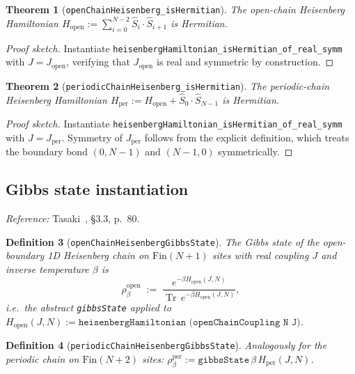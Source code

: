 \documentclass[a4paper,11pt]{article}
\newtheorem{theorem}{Theorem}
\newtheorem{definition}[theorem]{Definition}
\begin{document}
\begin{theorem}[\texttt{openChainHeisenberg\_isHermitian}]
The open-chain Heisenberg Hamiltonian
$H_{\mathrm{open}} := \sum_{i=0}^{N-2} \hat S_i \cdot \hat S_{i+1}$
is Hermitian.
\end{theorem}

\begin{proof}[Proof sketch]
Instantiate \texttt{heisenbergHamiltonian\_isHermitian\_of\_real\_symm}
with $J = J_{\mathrm{open}}$, verifying that $J_{\mathrm{open}}$ is
real and symmetric by construction.
\end{proof}

\begin{theorem}[\texttt{periodicChainHeisenberg\_isHermitian}]
The periodic-chain Heisenberg Hamiltonian
$H_{\mathrm{per}} := H_{\mathrm{open}} + \hat S_0 \cdot \hat S_{N-1}$
is Hermitian.
\end{theorem}

\begin{proof}[Proof sketch]
Instantiate \texttt{heisenbergHamiltonian\_isHermitian\_of\_real\_symm}
with $J = J_{\mathrm{per}}$.  Symmetry of $J_{\mathrm{per}}$ follows
from the explicit definition, which treats the boundary bond
$(0, N-1)$ and $(N-1, 0)$ symmetrically.
\end{proof}

\subsection{Gibbs state instantiation}
\label{subsec:heisenberg-gibbs}

\emph{Reference:} Tasaki~\cite{Tasaki:QMB}, §3.3, p.~80.

\begin{definition}[\texttt{openChainHeisenbergGibbsState}]
The Gibbs state of the open-boundary 1D Heisenberg chain on
$\mathrm{Fin}(N+1)$ sites with real coupling $J$ and inverse temperature
$\beta$ is
\[
  \rho_\beta^{\mathrm{open}} \;:=\;
  \frac{e^{-\beta H_{\mathrm{open}}(J,N)}}{\operatorname{Tr}\,e^{-\beta H_{\mathrm{open}}(J,N)}},
\]
i.e.\ the abstract \texttt{gibbsState} applied to
$H_{\mathrm{open}}(J,N) := \texttt{heisenbergHamiltonian (openChainCoupling N J)}$.
\end{definition}

\begin{definition}[\texttt{periodicChainHeisenbergGibbsState}]
Analogously for the periodic chain on $\mathrm{Fin}(N+2)$ sites:
$\rho_\beta^{\mathrm{per}} := \texttt{gibbsState}\,\beta\,
H_{\mathrm{per}}(J,N)$.
\end{definition}
\end{document}
